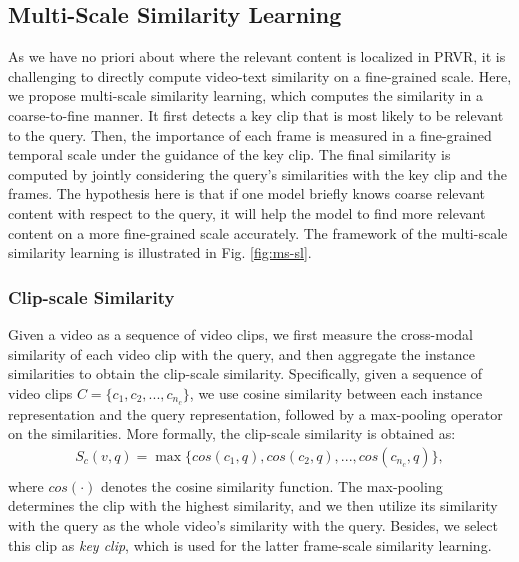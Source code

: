 \documentclass[sigconf]{acmart}
\begin{document}
\subsection{Multi-Scale Similarity Learning}\label{ssec:mssl}
As we have no priori about where the relevant content is localized in PRVR, it is challenging to directly compute video-text similarity on a fine-grained scale.
Here, we propose multi-scale similarity learning, which computes the similarity in a coarse-to-fine manner.
It first detects a key clip that is most likely to be relevant to the query. 
Then, the importance of each frame is measured in a fine-grained temporal scale under the guidance of the key clip.
The final similarity is computed by jointly considering the query's similarities with the key clip and the frames.
The hypothesis here is that if one model briefly knows coarse relevant content with respect to the query, it will help the model to find more relevant content on a more fine-grained scale accurately.
The framework of the multi-scale similarity learning is illustrated in Fig. \ref{fig:ms-sl}.

\subsubsection{Clip-scale Similarity}\label{ssec:clip}
Given a video as a sequence of video clips, we first measure the cross-modal similarity of each video clip with the query, and then aggregate the instance similarities to obtain the clip-scale similarity.
Specifically, given a sequence of video clips $C=\{c_1, c_2, ..., c_{n_c}\}$, 
we use cosine similarity between each instance representation and the query representation, followed by a max-pooling operator on the similarities. More formally, the clip-scale similarity is obtained as:
\begin{equation}
\begin{aligned}
     S_c(v, q) = \mathop{\max}\{cos(c_1, q), cos(c_2, q),...,cos(c_{n_c}, q)\},\\
\end{aligned}
\end{equation}
where $cos(\cdot)$ denotes the cosine similarity function.
The max-pooling determines the clip with the highest similarity, and we then utilize its similarity with the query as the whole video's similarity with the query. Besides, we select this clip as \emph{key clip}, which is used for the latter frame-scale similarity learning.
\end{document}
